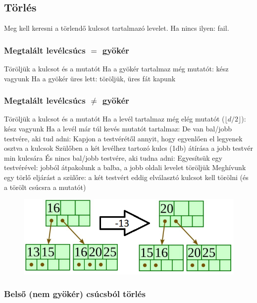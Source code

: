 \documentclass[12pt,a4paper]{article}
\begin{document}
\pagebreak

\subsection{Törlés}

Meg kell keresni a törlendő kulcsot tartalmazó levelet.
Ha nincs ilyen: fail.

\subsubsection{Megtalált levélcsúcs $=$ gyökér}

\begin{outline}
	\1 Töröljük a kulcsot és a mutatót
	\1 Ha a gyökér tartalmaz még mutatót: kész vagyunk
	\1 Ha a gyökér üres lett: töröljük, üres fát kapunk
\end{outline}

\subsubsection{Megtalált levélcsúcs $\ne$ gyökér}

\begin{outline}
	\1 Töröljük a kulcsot és a mutatót
	\1 Ha a levél tartalmaz még elég mutatót ($\lfloor d/2 \rfloor$): kész vagyunk
	\1 Ha a levél már túl kevés mutatót tartalmaz:
		\2 De van bal/jobb testvére, aki tud adni:
			\3 Kapjon a testvérétől annyit, hogy egyenlően el legyenek osztva a kulcsok
			\3 Szülőben a két levélhez tartozó kulcs (1db) átírása a jobb testvér min kulcsára
		\2 És nincs bal/jobb testvére, aki tudna adni:
			\3 Egyesítsük egy testvérével: jobból átpakolunk a balba, a jobb oldali levelet töröljük
			\3 Meghívunk egy törlő eljárást a szülőre: a két testvért eddig elválasztó kulcsot kell törölni (és a törölt csúcsra a mutatót)
\end{outline}

\begin{figure}[h!]
	\centering
	\includegraphics[width=0.5\linewidth]{b+ törlés levél}
\end{figure}

\pagebreak

\subsubsection{Belső (nem gyökér) csúcsból törlés}
\end{document}

